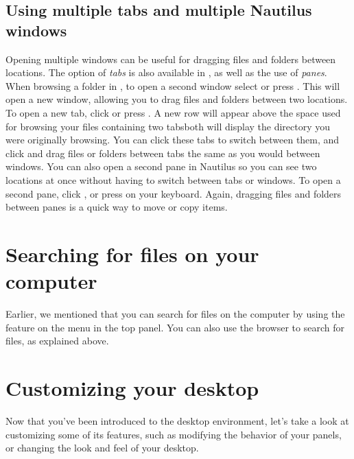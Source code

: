 \subsection{Using multiple tabs and multiple Nautilus windows}
Opening multiple  windows can be useful for dragging files and folders between locations. The option of \emph{tabs} is also available in , as well as the use of \emph{panes}.
When browsing a folder in , to open a second window select  or press . This will open a new window, allowing you to drag files and folders between two locations. To open a new tab, click  or press . A new row will appear above the space used for browsing your files containing two tabs\dash both will display the directory you were originally browsing. You can click these tabs to switch between them, and click and drag files or folders between tabs the same as you would between windows. You can also open a second pane in Nautilus so you can see two locations at once without having to switch between tabs or windows. To open a second pane, click , or press  on your keyboard. Again, dragging files and folders between panes is a quick way to move or copy items.

\section{Searching for files on your computer}

Earlier, we mentioned that you can search for files on the computer by using the 
feature on the  menu in the top panel.  You can also use the 
browser to search for files, as explained above.

\section{Customizing your desktop}
\label{sec:customizing-desktop}
Now that you've been introduced to the  desktop environment, let's take a look
at customizing some of its features, such as modifying the behavior of your panels, or changing the look and feel of your desktop.


